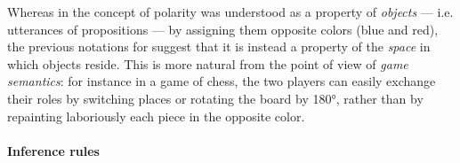 \begin{remark}
  Whereas in  the concept of polarity was understood as a property
  of \emph{objects} --- i.e. utterances of propositions --- by assigning them
  opposite colors (blue and red), the previous notations for  suggest that
  it is instead a property of the \emph{space} in which objects reside. This is
  more natural from the point of view of \emph{game semantics}: for instance in
  a game of chess, the two players can easily exchange their roles by switching
  places or rotating the board by 180°, rather than by repainting laboriously
  each piece in the opposite color.
\end{remark}

\paragraph{Inference rules}

